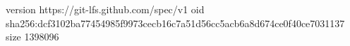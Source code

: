 version https://git-lfs.github.com/spec/v1
oid sha256:dcf3102ba77454985f9973cecb16c7a51d56cc5acb6a8d674ce0f40ce7031137
size 1398096
